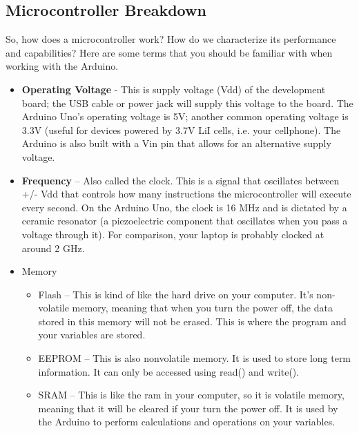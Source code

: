 \documentclass[10pt]{report}
\begin{document}
\subsection*{Microcontroller Breakdown}

So, how does a microcontroller work? How do we characterize its performance and capabilities? Here are some terms that you should be familiar with when working with the Arduino. 

 \begin{itemize}
\item \textbf{Operating Voltage} - This is supply voltage (Vdd) of the development board; the USB cable or power jack will supply this voltage to the board. The Arduino Uno’s operating voltage is 5V; another common operating voltage is 3.3V (useful for devices powered by 3.7V LiI cells, i.e. your cellphone). The Arduino is also built with a Vin pin that allows for an alternative supply voltage.
  
\item \textbf{Frequency} – Also called the clock. This is a signal that oscillates between +/- Vdd that controls how many instructions the microcontroller will execute every second. On the Arduino Uno, the clock is 16 MHz and is dictated by a ceramic resonator (a piezoelectric component that oscillates when you pass a voltage through it). For comparison, your laptop is probably clocked at around 2 GHz.

\item Memory
\begin{itemize}

\item Flash – This is kind of like the hard drive on your computer. It’s non-volatile memory, meaning that when you turn the power off, the data stored in this memory will not be erased. This is where the program and your variables are stored.

\item EEPROM – This is also nonvolatile memory. It is used to store long term information. It can only be accessed using read() and write().

\item SRAM – This is like the ram in your computer, so it is volatile memory, meaning that it will be cleared if your turn the power off. It is used by the Arduino to perform calculations and operations on your variables.

\end{itemize}
\end{itemize}
\end{document}
